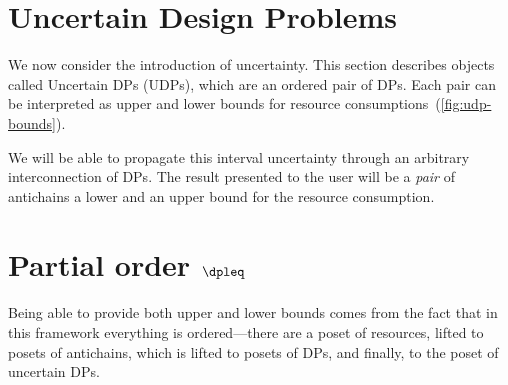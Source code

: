 \section{Uncertain Design Problems}
\label{sec:UDP}

We now consider the introduction of uncertainty. This section describes
objects called Uncertain DPs (UDPs), which are an ordered pair of
DPs. Each pair can be interpreted as upper and lower bounds for resource
consumptions~(\cref{fig:udp-bounds}).


We will be able to propagate this interval uncertainty through an
arbitrary interconnection of DPs. The result presented to the user
will be a \emph{pair} of antichains \textemdash{} a lower and an upper
bound for the resource consumption.


\section{Partial order $\dpleq$}

Being able to provide both upper and lower bounds comes from the fact
that in this framework everything is ordered---there are
a poset of resources, lifted to posets of antichains, which is lifted
to posets of DPs, and finally, to the poset of uncertain DPs.


